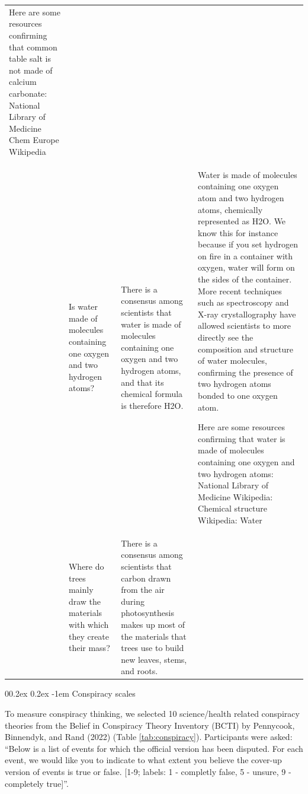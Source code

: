 \documentclass[
  doc,floatsintext]{apa6}
\makeatletter
\let\oldparagraph\paragraph
\renewcommand{\paragraph}[1]{\oldparagraph{#1}\mbox{}}
\renewcommand{\paragraph}{\@startsection{paragraph}{4}{\parindent}%
  {0\baselineskip \@plus 0.2ex \@minus 0.2ex}%
  {-1em}%
  {\normalfont\normalsize\bfseries\itshape\typesectitle}}
\makeatother
\begin{document}
\begin{longtable}[t]{>{\raggedleft\arraybackslash}p{1em}>{\raggedright\arraybackslash}p{10em}>{\raggedright\arraybackslash}p{10em}>{\raggedright\arraybackslash}p{23em}}
Here are some resources confirming that common table salt is not made of calcium carbonate: 
National Library of Medicine 
Chem Europe 
Wikipedia\\
10 & Is water made of molecules containing one oxygen and two hydrogen atoms? & There is a consensus among scientists that water is made of molecules containing one oxygen and two hydrogen atoms, and that its chemical formula is therefore H2O. & Water is made of molecules containing one oxygen atom and two hydrogen atoms, chemically represented as H2O. We know this for instance because if you set hydrogen on fire in a container with oxygen, water will form on the sides of the container. More recent techniques such as spectroscopy and X-ray crystallography have allowed scientists to more directly see the composition and structure of water molecules, confirming the presence of two hydrogen atoms bonded to one oxygen atom.

Here are some resources confirming that water is made of molecules containing one oxygen and two hydrogen atoms:
National Library of Medicine 
Wikipedia: Chemical structure 
Wikipedia: Water\\
\addlinespace
11 & Where do trees mainly draw the materials with which they create their mass? & There is a consensus among scientists that carbon drawn from the air during photosynthesis makes up most of the materials that trees use to build new leaves, stems, and roots. & \\
\bottomrule
\end{longtable}
\endgroup{}

\paragraph{Conspiracy scales}\label{conspiracy-scales}

To measure conspiracy thinking, we selected 10 science/health related conspiracy theories from the Belief in Conspiracy Theory Inventory (BCTI) by Pennycook, Binnendyk, and Rand (2022) (Table \ref{tab:conspiracy}). Participants were asked: ``Below is a list of events for which the official version has been disputed. For each event, we would like you to indicate to what extent you believe the cover-up version of events is true or false. {[}1-9; labels: 1 - completly false, 5 - unsure, 9 - completely true{]}''.

\begingroup\fontsize{8}{10}\selectfont
\end{document}
